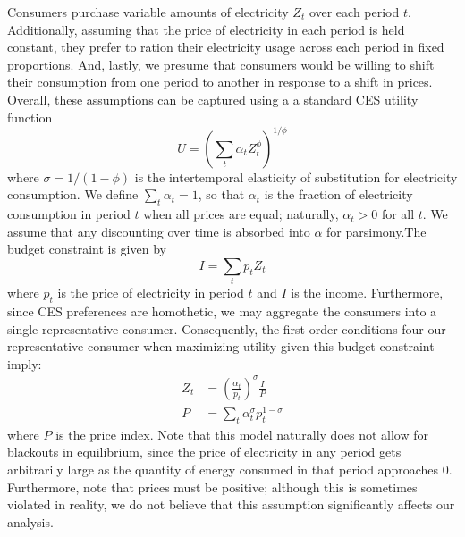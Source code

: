 \documentclass[11pt,a4paper]{extarticle}
\begin{document}
Consumers purchase variable amounts of electricity $Z_t$ over each period $t$. Additionally, assuming that the price of electricity in each period is held constant, they prefer to ration their electricity usage across each period in fixed proportions. And, lastly, we presume that consumers would be willing to shift their consumption from one period to another in response to a shift in prices. Overall, these assumptions can be captured using a a standard CES utility function
\begin{equation}
U = \left( \sum_t \alpha_t Z_t^\phi  \right)^{1/\phi}
\end{equation}
where $\sigma = 1/(1-\phi)$ is the intertemporal elasticity of substitution for electricity consumption. We define $\sum_t \alpha_t = 1$, so that $\alpha_t$ is the fraction of electricity consumption in period $t$ when all prices are equal; naturally, $\alpha_t > 0$ for all $t$. We assume that any discounting over time is absorbed into $\alpha$ for parsimony.The budget constraint is given by
\begin{equation}
I = \sum_t p_t Z_t
\end{equation}
where $p_t$ is the price of electricity in period $t$ and $I$ is the income. Furthermore, since CES preferences are homothetic, we may aggregate the consumers into a single representative consumer. Consequently, the first order conditions four our representative consumer when maximizing utility given this budget constraint imply:
\begin{align}
Z_t &= \left(\frac{\alpha_t}{p_t} \right)^\sigma \frac{I}{P} \\
P &= \sum_t \alpha_t^\sigma p_t^{1-\sigma}
\end{align}
where $P$ is the price index. Note that this model naturally does not allow for blackouts in equilibrium, since the price of electricity in any period gets arbitrarily large as the quantity of energy consumed in that period approaches 0. Furthermore, note that prices must be positive; although this is sometimes violated in reality, we do not believe that this assumption significantly affects our analysis. 
\end{document}

